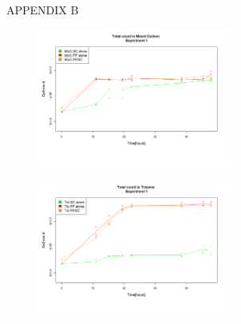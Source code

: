 \documentclass[a4paper, 10pt, conference]{ieeeconf}   %
\begin{document}
\begin{landscape}
	
	
	\begin{figure}
		APPENDIX B
		
		\flushleft
		\begin{subfigure}{.35\textheight}
			\centering
			
			\includegraphics[width=6.5cm]{totcount_mixC1.png}
			\caption{}
			
			\label{totcountmixC1}
		\end{subfigure}%
		\begin{subfigure}{.35\textheight}
			\centering
			
			\includegraphics[width=6.5cm]{totcount_tol1.png}
			\caption{}
			\label{totcounttol1}
		\end{subfigure}%
		\begin{subfigure}{.35\textheight}
			\centering
			

\end{subfigure}
\end{figure}
\end{landscape}
\end{document}
